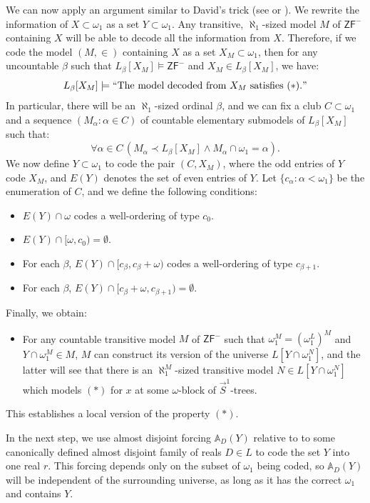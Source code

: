 \documentclass[a4paper,11pt]{article}
\newcommand{\ZFP}{\mathsf{ZF}^-}
\begin{document}
{We can now apply an argument similar to David’s trick (see \cite{David} or \cite{Friedman}). We rewrite the information of \(X \subset \omega_1\) as a set \(Y \subset \omega_1\). Any transitive, \(\aleph_1\)-sized model \(M\) of \(\ZFP\) containing \(X\) will be able to decode all the information from \(X\). Therefore, if we code the model \((M, \in)\) containing \(X\) as a set \(X_M \subset \omega_1\), then for any uncountable \(\beta\) such that \(L_{\beta}[X_M] \models \ZFP\) and \(X_M \in L_{\beta}[X_M]\), we have:
\[
L_{\beta}[X_M] \models \text{``The model decoded from } X_M \text{ satisfies } (\ast)."
\]
In particular, there will be an \(\aleph_1\)-sized ordinal \(\beta\), and we can fix a club \(C \subset \omega_1\) and a sequence \((M_{\alpha} : \alpha \in C)\) of countable elementary submodels of \(L_{\beta}[X_M]\) such that:
\[
\forall \alpha \in C \, (M_{\alpha} \prec L_{\beta}[X_M] \land M_{\alpha} \cap \omega_1 = \alpha).
\]
We now define \(Y \subset \omega_1\) to code the pair \((C, X_M)\), where the odd entries of \(Y\) code \(X_M\), and \(E(Y)\) denotes the set of even entries of \(Y\). Let \(\{c_{\alpha} : \alpha < \omega_1\}\) be the enumeration of \(C\), and we define the following conditions:
\begin{itemize}
\item[-] \(E(Y) \cap \omega\) codes a well-ordering of type \(c_0\).
\item[-] \(E(Y) \cap [\omega, c_0) = \emptyset\).
\item[-] For each \(\beta\), \(E(Y) \cap [c_{\beta}, c_{\beta} + \omega)\) codes a well-ordering of type \(c_{\beta+1}\).
\item[-]For each \(\beta\), \(E(Y) \cap [c_{\beta} + \omega, c_{\beta+1}) = \emptyset\).
\end{itemize}

Finally, we obtain:
\begin{itemize}
\item[$({\ast}{\ast})$] For any countable transitive model $M$ of $\ZFP$ such that $\omega_1^M=(\omega_1^L)^M$ and $ Y \cap \omega_1^M \in M$, $M$ can construct its version of the universe $L[Y \cap \omega_1^N]$, and the latter will see that there is an $\aleph_1^M$-sized transitive model $N \in L[Y \cap \omega_1^N]$ which models $(\ast)$ for $x$ at some $\omega$-block of $\vec{S}^1$-trees.
\end{itemize}
This establishes a local version of the property \((\ast)\).

In the next step, we use almost disjoint forcing \(\mathbb{A}_D(Y)\) relative to to some canonically defined almost disjoint family of reals \(D \in L\) to code the set \(Y\) into one real \(r\). This forcing depends only on the subset of \(\omega_1\) being coded, so \(\mathbb{A}_D(Y)\) will be independent of the surrounding universe, as long as it has the correct \(\omega_1\) and contains \(Y\).

}
\end{document}
